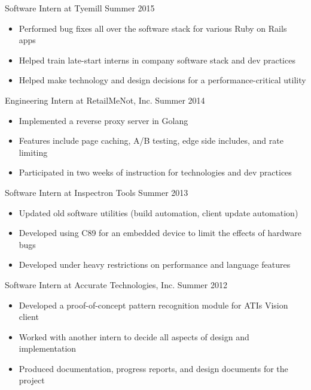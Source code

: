 \documentclass[line,margin]{res}
\begin{document}
\begin{resume}
                {\sc Software Intern at Tyemill} \hfill Summer 2015
                 \begin{itemize}  \itemsep -2pt %
                 \item Performed bug fixes all over the software stack for various Ruby on Rails apps
	      \item Helped train late-start interns in company software stack and dev practices
	      \item Helped make technology and design decisions for a performance-critical utility
                 \end{itemize}

                {\sc Engineering Intern at RetailMeNot, Inc.} \hfill Summer 2014
                 \begin{itemize}  \itemsep -2pt %
                 \item Implemented a reverse proxy server in Golang
                 \item Features include page caching, A/B testing, edge side includes, and rate limiting
                 \item Participated in two weeks of instruction for technologies and dev practices
                 \end{itemize}

                {\sc Software Intern at Inspectron Tools} \hfill Summer 2013
                 \begin{itemize}  \itemsep -2pt %
                 \item Updated old software utilities (build automation, client update automation)
                 \item Developed using C89 for an embedded device to limit the effects of hardware bugs
                 \item Developed under heavy restrictions on performance and language features
                 \end{itemize}
 
                {\sc Software Intern at Accurate Technologies, Inc.} \hfill            Summer 2012
                 \begin{itemize}  \itemsep -2pt %
                 \item Developed a proof-of-concept pattern recognition module for ATI\textquotesingle s Vision client
                 \item Worked with another intern to decide all aspects of design and implementation
                 \item Produced documentation, progress reports, and design documents for the project
                 \end{itemize} 


\end{resume}
\end{document}
